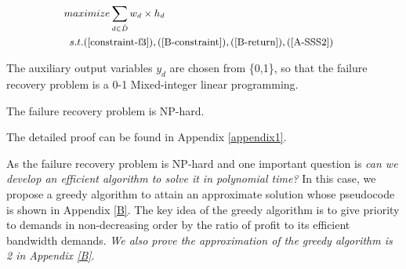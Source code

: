 \documentclass[sigconf]{acmart}
\begin{document}
\begin{equation}
\small
\begin{aligned} \label{BATE-recovery}
 &maximize  \sum_{d\in \hat{D}} w_d\times h_d\\
&\begin{array}{r@{\quad}r@{}l@{\quad}l}
s.t.  (\ref{constraint-f3}), (\ref{B-constraint}), (\ref{B-return}), (\ref{A-SSS2})
\end{array}
\end{aligned}
\end{equation}


The auxiliary output variables $y_d$ are chosen from \{0,1\},  so that the  failure recovery problem is a 0-1 Mixed-integer linear programming.

\begin{lemma}\label{NP-hard}
The failure recovery problem is NP-hard.
\end{lemma}
The detailed proof can be found in Appendix \ref{appendix1}.



As the failure recovery problem is NP-hard and one important question is \textit{can we develop an efficient algorithm to solve it in polynomial time?} 
In this case,  we propose a greedy algorithm to attain an approximate solution whose pseudocode is shown in Appendix \ref{B}.
The key idea of the greedy algorithm is to give priority to demands in non-decreasing order by the ratio of profit to its efficient bandwidth demands.
\textit{We also prove the approximation of the greedy algorithm is 2  in Appendix \ref{B}}. 
\end{document}
